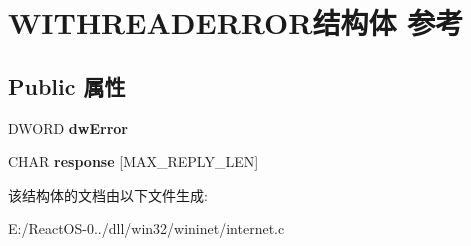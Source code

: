 \hypertarget{struct_w_i_t_h_r_e_a_d_e_r_r_o_r}{}\section{W\+I\+T\+H\+R\+E\+A\+D\+E\+R\+R\+O\+R结构体 参考}
\label{struct_w_i_t_h_r_e_a_d_e_r_r_o_r}
\subsection*{Public 属性}
\begin{DoxyCompactItemize}
\item 
\mbox{\label{struct_w_i_t_h_r_e_a_d_e_r_r_o_r_ad707a8ce1c514fa7f438e08ad141552a}} 
D\+W\+O\+RD {\bfseries dw\+Error}
\item 
\mbox{\label{struct_w_i_t_h_r_e_a_d_e_r_r_o_r_a9ce8aac797c2405185d4469d41817683}} 
C\+H\+AR {\bfseries response} \mbox{[}M\+A\+X\+\_\+\+R\+E\+P\+L\+Y\+\_\+\+L\+EN\mbox{]}
\end{DoxyCompactItemize}


该结构体的文档由以下文件生成\+:\begin{DoxyCompactItemize}
\item 
E\+:/\+React\+O\+S-\/0../dll/win32/wininet/internet.\+c\end{DoxyCompactItemize}
